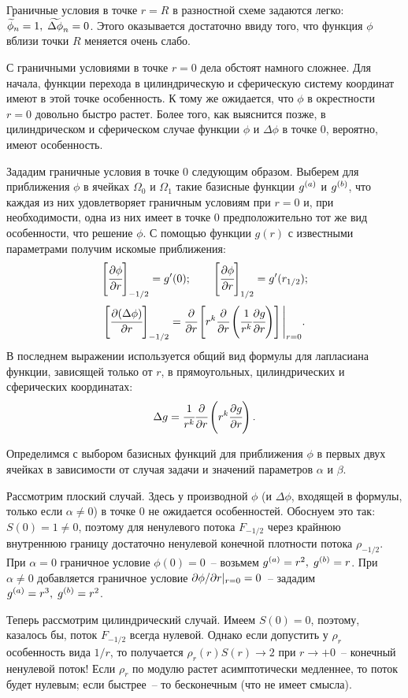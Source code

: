 Граничные условия в точке $r = R$ в разностной схеме задаются легко: ${\widetilde{\phi}}_n = 1, \; {\widetilde{\Delta \phi}}_n = 0$. Этого оказывается достаточно ввиду того, что функция $\phi$ вблизи точки $R$ меняется очень слабо.

С граничными условиями в точке $r = 0$ дела обстоят намного сложнее. Для начала, функции перехода в цилиндрическую и сферическую систему координат имеют в этой точке особенность. К тому же ожидается, что $\phi$ в окрестности $r = 0$ довольно быстро растет. Более того, как выяснится позже, в цилиндрическом и сферическом случае функции $\phi$ и $\Delta \phi$ в точке $0$, вероятно, имеют особенность.

Зададим граничные условия в точке $0$ следующим образом. Выберем для приближения $\phi$ в ячейках $\Omega_0$ и $\Omega_1$ такие базисные функции ${g^{(a)}}$ и ${g^{(b)}}$, что каждая из них удовлетворяет граничным условиям при $r = 0$ и, при необходимости, одна из них имеет в точке $0$ предположительно тот же вид особенности, что решение $\phi$. С помощью функции $g(r)$ с известными параметрами получим искомые приближения:
$${\left[ \cfrac{\partial \phi}{\partial r} \right]}_{-1/2} = g'(0); \qquad {\left[ \cfrac{\partial \phi}{\partial r} \right]}_{1/2} = g'(r_{1/2}) {\text{;}}$$
$${\left[ \cfrac{\partial (\Delta \phi)}{\partial r} \right]}_{-1/2} = \cfrac{\partial }{\partial r} \left[ r^k \cfrac{\partial }{\partial r} \left(\cfrac{1}{r^k} \cfrac{\partial g}{\partial r} \right) \right] \Bigg|_{r = 0} {\text{.}}$$
В последнем выражении используется общий вид формулы для лапласиана функции, зависящей только от $r$, в прямоугольных, цилиндрических и сферических координатах:
\begin{equation}
	\Delta g = \cfrac{1}{r^k} \cfrac{\partial }{\partial r} \left( r^k \cfrac{\partial g}{\partial r} \right) {\text{.}}
	\label{eq:laplasian_common}
\end{equation}

Определимся с выбором базисных функций для приближения $\phi$ в первых двух ячейках в зависимости от случая задачи и значений параметров $\alpha$ и $\beta$.

Рассмотрим плоский случай. Здесь у производной $\phi$ (и $\Delta \phi$, входящей в формулы, только если $\alpha \neq 0$) в точке $0$ не ожидается особенностей. Обоснуем это так: $S(0) = 1 \neq 0$, поэтому для ненулевого потока $F_{-1/2}$ через крайнюю внутреннюю границу достаточно ненулевой конечной плотности потока $\rho_{-1/2}$. При $\alpha = 0$ граничное условие $\phi(0) = 0$~-- возьмем ${g^{(a)}} = r^2, \; {g^{(b)}} = r$. При~$\alpha \neq 0$ добавляется граничное условие $\partial \phi / \partial r |_{r = 0} = 0$~-- зададим ${g^{(a)}} = r^3, \; {g^{(b)}} = r^2$.

Теперь рассмотрим цилиндрический случай. Имеем $S(0) = 0$, поэтому, казалось бы, поток $F_{-1/2}$ всегда нулевой. Однако если допустить у $\rho_r$ особенность вида $1/r$, то получается $\rho_r(r) S(r) \to 2$ при $r \to +0$~-- конечный ненулевой поток! Если $\rho_r$ по модулю растет асимптотически медленнее, то поток будет нулевым; если быстрее~-- то бесконечным (что не имеет смысла).

